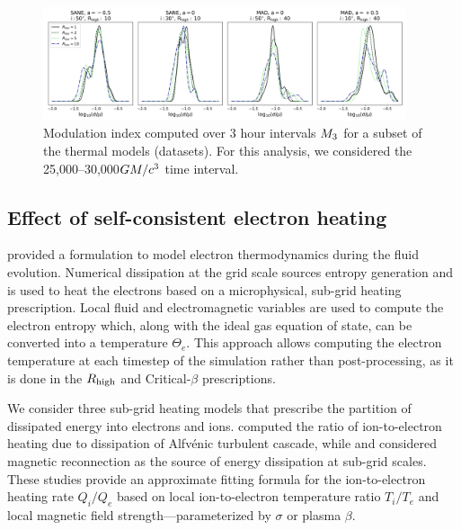\begin{figure}
  \centering
  \includegraphics[width=0.95\textwidth]{figures/mi_rlow_select_models.png}
  \caption{Modulation index computed over 3 hour intervals $M_{3}$ for a subset of the thermal models (\kharma datasets). For this analysis, we considered the 25,000--30,000$GM/c^3$ time interval.}
  \label{fig:mi_rlow}
\end{figure}






\subsection{Effect of self-consistent electron heating}


\citealt{10.1093/mnras/stv2084} provided a formulation to model electron thermodynamics during the fluid evolution. Numerical dissipation at the grid scale sources entropy generation and is used to heat the electrons based on a microphysical, sub-grid heating prescription. Local fluid and electromagnetic variables are used to compute the electron entropy which, along with the ideal gas equation of state, can be converted into a temperature $\Theta_{e}$. This approach allows computing the electron temperature at each timestep of the simulation rather than post-processing, as it is done in the $R_\mathrm{high}$ and Critical-$\beta$ prescriptions.

We consider three sub-grid heating models that prescribe the partition of dissipated energy into electrons and ions.
\citep{2010MNRAS.409L.104H} computed the ratio of ion-to-electron heating due to dissipation of Alfv\'enic turbulent cascade, while \citep{10.1093/mnras/stx2530} and \citep{Rowan_2017} considered magnetic reconnection as the source of energy dissipation at sub-grid scales. These studies provide an approximate fitting formula for the ion-to-electron heating rate $Q_{i}/Q_{e}$ based on local ion-to-electron temperature ratio $T_{i}/T_{e}$ and local magnetic field strength---parameterized by $\sigma$ or plasma $\beta$.

